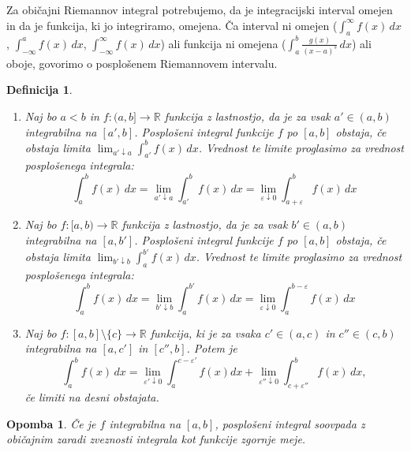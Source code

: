 \documentclass[10pt, a4paper]{article}
\newtheorem{defi}{Definicija}[section]
\newenvironment{noticeB}{%
  \tcolorbox[%
  notitle,
  empty,
  enhanced,  %
  breakable,
  coltext=black,
  colback=white, 
  fontupper=\rmfamily,
  parbox=false,
  noparskip,
  sharp corners,
  boxrule=-1pt,  %
  frame hidden,
  left=7pt,  %
  right=7pt,
  top=5pt,
  bottom=5pt,
  before skip=2.5ex plus 2pt,
  after skip=2.5ex plus 2pt,
  borderline west = {1.5pt}{-0.1pt}{blue!30!black}, %
  overlay unbroken and last={%
    \draw[color=black, line width=1.25pt]
    ($(frame.south west)+(1.pt, -0.1pt)$) -- ++(2em, 0);
  }
  ]}
{\endtcolorbox}
\newenvironment{definicija}{\begin{defi}\begin{noticeB}}{%
    \end{noticeB}\end{defi}}
\newtheorem*{opomba}{Opomba}
\newcommand{\R}{\mathbb {R}}
\newcommand{\rlimf}[3]{\lim_{#1 \downarrow #2} {#3}}
\begin{document}
Za običajni Riemannov integral potrebujemo, da je integracijski interval omejen in da je funkcija, ki jo integriramo, omejena.
Ča interval ni omejen ($\int_a ^{\infty} f(x)\,dx$, $\int_{-\infty} ^a f(x)\,dx$, $\int_{-\infty} ^{\infty} f(x)\,dx$)
ali funkcija ni omejena ($\int_a ^b \frac{g(x)}{(x-a)^s}\,dx$) ali oboje, govorimo o posplošenem Riemannovem intervalu.

\begin{definicija}
    \begin{enumerate}
        \item Naj bo $a < b$ in $f: (a, b] \rightarrow \R$ funkcija z lastnostjo, da je za vsak $a' \in (a, b)$ integrabilna na $[a', b]$.
        Posplošeni integral funkcije $f$ po $[a, b]$ obstaja, če obstaja limita $\rlimf{a'}{a}{\int_{a'} ^b f(x)\,dx}$.
        Vrednost te limite proglasimo za vrednost posplošenega integrala: $$\int_{a} ^b f(x)\,dx = \rlimf{a'}{a}{\int_{a'} ^b f(x)\,dx} = \rlimf{\varepsilon}{0}{\int_{a+\varepsilon} ^b f(x)\,dx}$$
        \item Naj bo $f: [a, b) \rightarrow \R$ funkcija z lastnostjo, da je za vsak $b' \in (a, b)$ integrabilna na $[a, b']$.
        Posplošeni integral funkcije $f$ po $[a, b]$ obstaja, če obstaja limita $\rlimf{b'}{b}{\int_{a} ^{b'} f(x)\,dx}$.
        Vrednost te limite proglasimo za vrednost posplošenega integrala: $$\int_{a} ^b f(x)\,dx = \rlimf{b'}{b}{\int_{a} ^{b'} f(x)\,dx} = \rlimf{\varepsilon}{0}{\int_{a} ^{b-\varepsilon} f(x)\,dx}$$
        \item Naj bo $f: [a, b] \setminus \{c\} \rightarrow \R$ funkcija, ki je za vsaka $c' \in (a, c)$ in $c''\in (c, b)$ integrabilna na $[a, c']$ in $[c'', b]$.
        Potem je $$\int_a ^b f(x)\,dx = \rlimf{\varepsilon'}{0}{\int_a ^{c-\varepsilon'} f(x)dx} + \rlimf{\varepsilon''}{0}{\int_{c+\varepsilon''} ^b f(x)}\,dx,$$
        če limiti na desni obstajata.
    \end{enumerate}
\end{definicija}

\begin{opomba}
    Če je $f$ integrabilna na $[a, b]$, posplošeni integral soovpada z običajnim zaradi zveznosti integrala kot funkcije zgornje meje.
\end{opomba}
\end{document}
